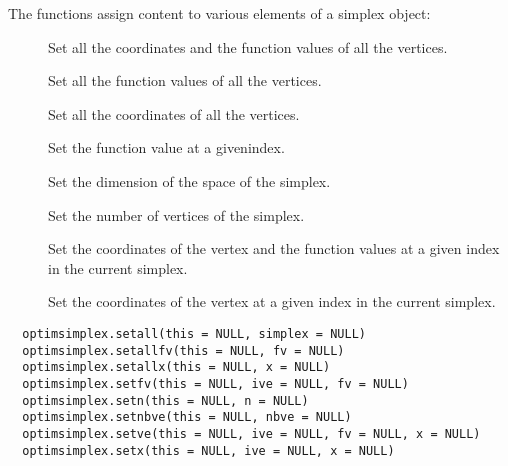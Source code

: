 %
\begin{Description}\relax
The functions assign content to various elements of a simplex object:
\begin{description}

\item[] Set all the coordinates and the function
values of all the vertices.
\item[] Set all the function values of all the
vertices.
\item[] Set all the coordinates of all the
vertices.
\item[] Set the function value at a givenindex.
\item[] Set the dimension of the space of the
simplex.
\item[] Set the number of vertices of the
simplex.
\item[] Set the coordinates of the vertex and the
function values at a given index in the current simplex.
\item[] Set the coordinates of the vertex at a given
index in the current simplex.

\end{description}

\end{Description}
%
\begin{Usage}
\begin{verbatim}
  optimsimplex.setall(this = NULL, simplex = NULL)
  optimsimplex.setallfv(this = NULL, fv = NULL)
  optimsimplex.setallx(this = NULL, x = NULL)
  optimsimplex.setfv(this = NULL, ive = NULL, fv = NULL)
  optimsimplex.setn(this = NULL, n = NULL)
  optimsimplex.setnbve(this = NULL, nbve = NULL)
  optimsimplex.setve(this = NULL, ive = NULL, fv = NULL, x = NULL)
  optimsimplex.setx(this = NULL, ive = NULL, x = NULL)
\end{verbatim}
\end{Usage}
